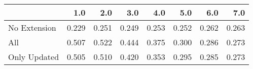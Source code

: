 \begin{tabular}{lrrrrrrr}
\toprule
{} &   1.0 &   2.0 &   3.0 &   4.0 &   5.0 &   6.0 &   7.0 \\
\midrule
No Extension & 0.229 & 0.251 & 0.249 & 0.253 & 0.252 & 0.262 & 0.263 \\
All          & 0.507 & 0.522 & 0.444 & 0.375 & 0.300 & 0.286 & 0.273 \\
Only Updated & 0.505 & 0.510 & 0.420 & 0.353 & 0.295 & 0.285 & 0.273 \\
\bottomrule
\end{tabular}
